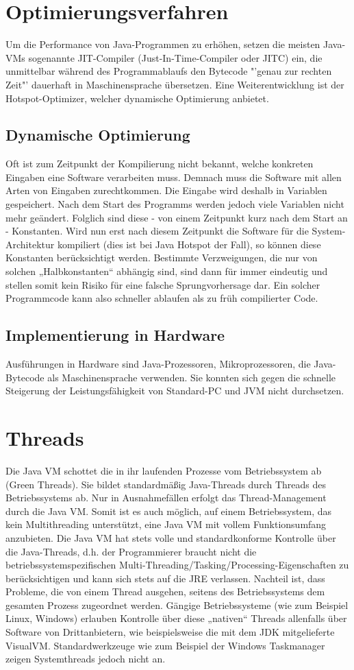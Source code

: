 \documentclass[a4paper,14pt]{scrreprt}
\begin{document}
\section{Optimierungsverfahren}
Um die Performance von Java-Programmen zu erhöhen, setzen die meisten Java-VMs sogenannte JIT-Compiler (Just-In-Time-Compiler oder JITC) ein, die unmittelbar während des Programmablaufs den Bytecode "'genau zur rechten Zeit"' dauerhaft in Maschinensprache übersetzen. Eine Weiterentwicklung ist der Hotspot-Optimizer, welcher dynamische Optimierung anbietet.
\subsection{Dynamische Optimierung}
Oft ist zum Zeitpunkt der Kompilierung nicht bekannt, welche konkreten Eingaben eine Software verarbeiten muss. Demnach muss die Software mit allen Arten von Eingaben zurechtkommen. Die Eingabe wird deshalb in Variablen gespeichert. Nach dem Start des Programms werden jedoch viele Variablen nicht mehr geändert. Folglich sind diese - von einem Zeitpunkt kurz nach dem Start an - Konstanten. Wird nun erst nach diesem Zeitpunkt die Software für die System-Architektur kompiliert (dies ist bei Java Hotspot der Fall), so können diese Konstanten berücksichtigt werden. Bestimmte Verzweigungen, die nur von solchen „Halbkonstanten“ abhängig sind, sind dann für immer eindeutig und stellen somit kein Risiko für eine falsche Sprungvorhersage dar. Ein solcher Programmcode kann also schneller ablaufen als zu früh compilierter Code.
\subsection{Implementierung in Hardware}
Ausführungen in Hardware sind Java-Prozessoren, Mikroprozessoren, die Java-Bytecode als Maschinensprache verwenden. Sie konnten sich gegen die schnelle Steigerung der Leistungsfähigkeit von Standard-PC und JVM nicht durchsetzen.
\section{Threads}
Die Java VM schottet die in ihr laufenden Prozesse vom Betriebssystem ab (Green Threads). Sie bildet standardmäßig Java-Threads durch Threads des Betriebssystems ab. Nur in Ausnahmefällen erfolgt das Thread-Management durch die Java VM. Somit ist es auch möglich, auf einem Betriebssystem, das kein Multithreading unterstützt, eine Java VM mit vollem Funktionsumfang anzubieten.
Die Java VM hat stets volle und standardkonforme Kontrolle über die Java-Threads, d.h. der Programmierer braucht nicht die betriebssystemspezifischen Multi-Threading/Tasking/Processing-Eigenschaften zu berücksichtigen und kann sich stets auf die JRE verlassen. Nachteil ist, dass Probleme, die von einem Thread ausgehen, seitens des Betriebssystems dem gesamten Prozess zugeordnet werden. Gängige Betriebssysteme (wie zum Beispiel Linux, Windows) erlauben Kontrolle über diese „nativen“ Threads allenfalls über Software von Drittanbietern, wie beispielsweise die mit dem JDK mitgelieferte VisualVM. Standardwerkzeuge wie zum Beispiel der Windows Taskmanager zeigen Systemthreads jedoch nicht an.
\end{document}
